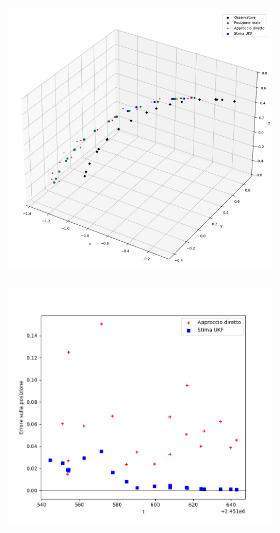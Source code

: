 \documentclass[12pt,a4paper,openright,twoside]{book}
\begin{document}
\begin{figure}
    \begin{subfigure}[b]{\linewidth}
        \centering
        \begin{subfigure}[b]{0.55\linewidth}
            \includegraphics[width=\linewidth]{figures/simulation_20_3d.png}
        \end{subfigure}%
        \hfill%
        \begin{subfigure}[b]{0.45\linewidth}
            \includegraphics[width=\linewidth]{figures/simulation_20_error.png}

\end{subfigure}
\end{subfigure}
\end{figure}
\end{document}
